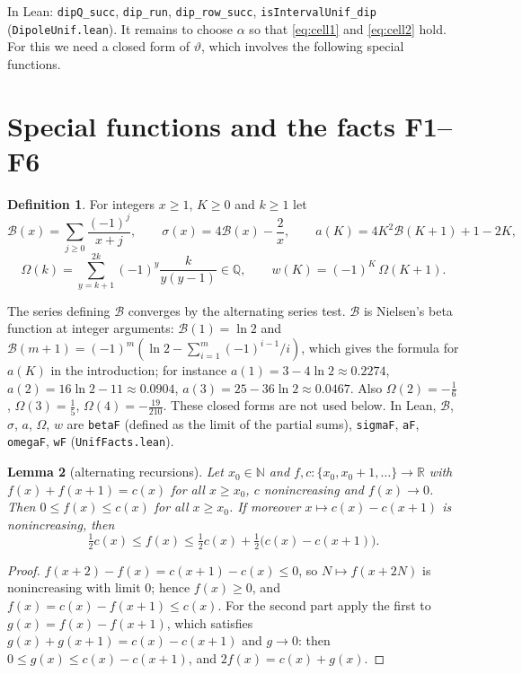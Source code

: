 \documentclass[11pt]{amsart}
\newtheorem{lemma}{Lemma}[section]
\theoremstyle{definition}
\newtheorem{definition}[lemma]{Definition}
\theoremstyle{remark}
\numberwithin{equation}{section}
\newcommand{\R}{\mathbb{R}}
\newcommand{\N}{\mathbb{N}}
\newcommand{\cB}{\mathcal{B}}
\newcommand{\lean}[1]{\texttt{#1}}
\begin{document}
In Lean: \lean{dipQ\_succ}, \lean{dip\_run}, \lean{dip\_row\_succ}, \lean{isIntervalUnif\_dip}
(\lean{DipoleUnif.lean}). It remains to choose $\alpha$ so that \eqref{eq:cell1} and \eqref{eq:cell2}
hold. For this we need a closed form of $\vartheta$, which involves the following special functions.

\section{Special functions and the facts F1--F6}\label{sec:special}

\begin{definition}\label{def:special}
For integers $x\ge1$, $K\ge0$ and $k\ge1$ let
\[
  \cB(x)=\sum_{j\ge0}\frac{(-1)^j}{x+j},\qquad \sigma(x)=4\cB(x)-\frac2x,\qquad
  a(K)=4K^2\cB(K+1)+1-2K,
\]
\[
  \Omega(k)=\sum_{y=k+1}^{2k}(-1)^y\frac{k}{y(y-1)}\in\mathbb{Q},\qquad w(K)=(-1)^K\,\Omega(K+1).
\]
\end{definition}

The series defining $\cB$ converges by the alternating series test. $\cB$ is Nielsen's beta function
at integer arguments: $\cB(1)=\ln2$ and $\cB(m+1)=(-1)^m(\ln2-\sum_{i=1}^m(-1)^{i-1}/i)$, which gives
the formula for $a(K)$ in the introduction; for instance $a(1)=3-4\ln2\approx0.2274$,
$a(2)=16\ln2-11\approx0.0904$, $a(3)=25-36\ln2\approx0.0467$. Also $\Omega(2)=-\frac16$,
$\Omega(3)=\frac15$, $\Omega(4)=-\frac{19}{210}$. These closed forms are not used below. In Lean,
$\cB$, $\sigma$, $a$, $\Omega$, $w$ are \lean{betaF} (defined as the limit of the partial sums),
\lean{sigmaF}, \lean{aF}, \lean{omegaF}, \lean{wF} (\lean{UnifFacts.lean}).

\begin{lemma}[alternating recursions]\label{lem:alt}
Let $x_0\in\N$ and $f,c:\{x_0,x_0+1,\dots\}\to\R$ with $f(x)+f(x+1)=c(x)$ for all $x\ge x_0$, $c$
nonincreasing and $f(x)\to0$. Then $0\le f(x)\le c(x)$ for all $x\ge x_0$. If moreover $x\mapsto c(x)-c(x+1)$
is nonincreasing, then
\[
  \tfrac12c(x)\le f(x)\le\tfrac12c(x)+\tfrac12\bigl(c(x)-c(x+1)\bigr).
\]
\end{lemma}

\begin{proof}
$f(x+2)-f(x)=c(x+1)-c(x)\le0$, so $N\mapsto f(x+2N)$ is nonincreasing with limit $0$; hence $f(x)\ge0$, and
$f(x)=c(x)-f(x+1)\le c(x)$. For the second part apply the first to $g(x)=f(x)-f(x+1)$, which satisfies
$g(x)+g(x+1)=c(x)-c(x+1)$ and $g\to0$: then $0\le g(x)\le c(x)-c(x+1)$, and $2f(x)=c(x)+g(x)$.
\end{proof}
\end{document}
